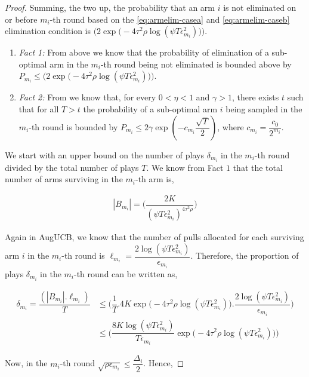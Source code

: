 \begin{proof}
Summing, the two up, the probability that an arm ${i}$ is not eliminated on or before $m_{i}$-th round based on the \ref{eq:armelim-casea} and \ref{eq:armelim-caseb} elimination condition is  $\bigg(2\exp\big(-4\tau^{2}\rho\log (\psi T\epsilon_{m_{i}}^{2})\big)\bigg)$. 


\begin{enumerate}
\item \emph{Fact 1:} From above we know that the probability of elimination of a sub-optimal arm in the $m_{i}$-th round being not eliminated is bounded above by $P_{m_{i}}\leq\bigg(2\exp\big(-4\tau^{2}\rho\log (\psi T\epsilon_{m_{i}}^{2})\big)\bigg)$.
\item \emph{Fact 2:} From \cite{tolpin2012mcts} we know that, for every $0<\eta <1$ and $\gamma > 1$, there exists $t$ such that for all $T>t$ the probability of a sub-optimal arm $i$ being sampled in the $m_{i}$-th round is bounded by $P_{m_{i}}\leq 2\gamma \exp(-c_{m_{i}}\dfrac{\sqrt{T}}{2})$, where $c_{m_{i}}=\dfrac{c_{0}}{2^{m_{i}}}$.
\end{enumerate}

We start with an upper bound on the number of plays $\delta_{m_{i}}$ in the $m_{i}$-th round divided by the total number of plays $T$. We know  from Fact $1$  that the total number of arms surviving in the $m_{i}$-th arm is, 

\begin{align*}
|B_{m_{i}}|=\bigg(\dfrac{2K}{(\psi T\epsilon_{m_{i}}^{2})^{4\tau^{2}\rho}}\bigg) 
\end{align*}     

Again in AugUCB, we know that the number of pulls allocated for each surviving arm $i$ in the $m_{i}$-th round is $\ell_{m_{i}}=\dfrac{2\log (\psi T \epsilon_{m_{i}}^{2})}{\epsilon_{m_{i}}}$. Therefore, the proportion of plays $\delta_{m_{i}}$ in the $m_{i}$-th round can be written as,

\begin{align*}
\delta_{m_{i}}=\dfrac{(|B_{m_{i}}|.\ell_{m_{i}})}{T} &\leq \bigg(\dfrac{1}{T}.4K\exp\big(-4\tau^{2}\rho\log (\psi T\epsilon_{m_{i}}^{2})\big).\dfrac{2\log (\psi T \epsilon_{m_{i}}^{2})}{\epsilon_{m_{i}}}\bigg)\\
& \leq \bigg(\dfrac{8K\log (\psi T \epsilon_{m_{i}}^{2})}{T\epsilon_{m_{i}}}\exp\big(-4\tau^{2}\rho\log (\psi T\epsilon_{m_{i}}^{2})\big)\bigg)
\end{align*}

Now, in the $m_{i}$-th round $\sqrt{\rho\epsilon_{m_{i}}}\leq \dfrac{\Delta_{i}}{2}$. Hence,


\end{proof}
